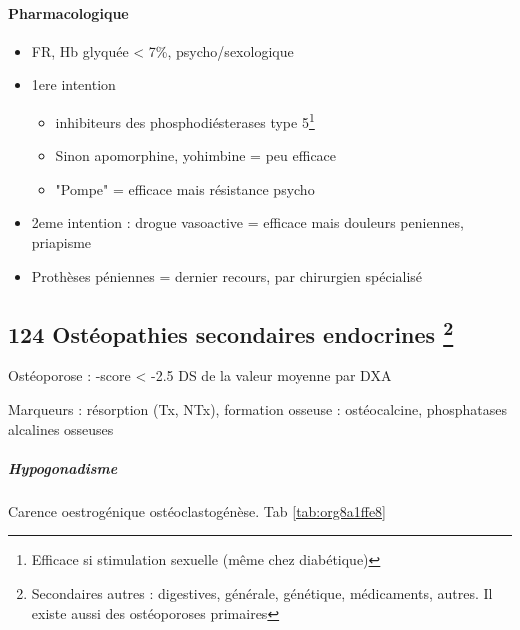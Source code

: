 \documentclass[11pt]{article}
\begin{document}
\paragraph{Pharmacologique}
\label{sec:orgc0fa42b}
\begin{itemize}
\item FR, Hb glyquée < 7\%, psycho/sexologique
\item 1ere intention 
\begin{itemize}
\item inhibiteurs des phosphodiésterases type 5\footnote{Efficace si stimulation sexuelle (même chez diabétique)}
\item Sinon apomorphine, yohimbine = peu efficace
\item "Pompe" = efficace mais résistance psycho
\end{itemize}
\item 2eme intention : drogue vasoactive = efficace mais douleurs peniennes, priapisme
\item Prothèses péniennes = dernier recours, par chirurgien spécialisé
\end{itemize}

\subsection{124 Ostéopathies secondaires endocrines \footnote{Secondaires autres : digestives, générale, génétique, médicaments,
autres. Il existe aussi des ostéoporoses primaires}}
\label{sec:org87683f0}
Ostéoporose : -score < -2.5 DS de la valeur moyenne par DXA

Marqueurs : résorption (Tx, NTx), formation osseuse : ostéocalcine, phosphatases alcalines osseuses

\subparagraph{Hypogonadisme}
\label{sec:org04a533b}
Carence oestrogénique \inc ostéoclastogénèse. Tab \ref{tab:org8a1ffe8}
\end{document}
